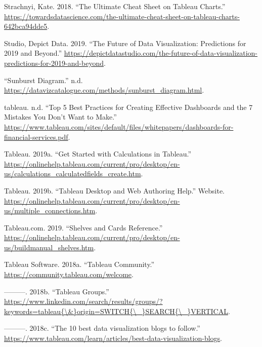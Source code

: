 \documentclass[]{book}
\begin{document}
\leavevmode\hypertarget{ref-Charts_CheatSheet}{}%
Strachnyi, Kate. 2018. ``The Ultimate Cheat Sheet on Tableau Charts.'' \url{https://towardsdatascience.com/the-ultimate-cheat-sheet-on-tableau-charts-642bca94dde5}.

\leavevmode\hypertarget{ref-depictdatastudio}{}%
Studio, Depict Data. 2019. ``The Future of Data Visualization: Predictions for 2019 and Beyond.'' \url{https://depictdatastudio.com/the-future-of-data-visualization-predictions-for-2019-and-beyond}.

\leavevmode\hypertarget{ref-sunburst-diag}{}%
``Sunburst Diagram.'' n.d. \url{https://datavizcatalogue.com/methods/sunburst_diagram.html}.

\leavevmode\hypertarget{ref-dashboard_practices}{}%
tableau. n.d. ``Top 5 Best Practices for Creating Effective Dashboards and the 7 Mistakes You Don't Want to Make.'' \href{\%20https://www.tableau.com/sites/default/files/whitepapers/dashboards-for-financial-services.pdf\%20}{https://www.tableau.com/sites/default/files/whitepapers/dashboards-for-financial-services.pdf}.

\leavevmode\hypertarget{ref-Tableau_Calculated_Fields}{}%
Tableau. 2019a. ``Get Started with Calculations in Tableau.'' \url{https://onlinehelp.tableau.com/current/pro/desktop/en-us/calculations_calculatedfields_create.htm}.

\leavevmode\hypertarget{ref-TableauHelp_connections}{}%
Tableau. 2019b. ``Tableau Desktop and Web Authoring Help.'' Website. \url{https://onlinehelp.tableau.com/current/pro/desktop/en-us/multiple_connections.htm}.

\leavevmode\hypertarget{ref-Tableau_Build_Manual}{}%
Tableau.com. 2019. ``Shelves and Cards Reference.'' \url{https://onlinehelp.tableau.com/current/pro/desktop/en-us/buildmanual_shelves.htm}.

\leavevmode\hypertarget{ref-Tableau_Community}{}%
Tableau Software. 2018a. ``Tableau Community.'' \url{https://community.tableau.com/welcome}.

\leavevmode\hypertarget{ref-LinkedIn_Groups}{}%
---------. 2018b. ``Tableau Groups.'' \href{https://www.linkedin.com/search/results/groups/?keywords=tableau\%7B/\&\%7Dorigin=SWITCH\%7B/_\%7DSEARCH\%7B/_\%7DVERTICAL}{https://www.linkedin.com/search/results/groups/?keywords=tableau\{\textbackslash{}\&\}origin=SWITCH\{\textbackslash{}\_\}SEARCH\{\textbackslash{}\_\}VERTICAL}.

\leavevmode\hypertarget{ref-Top_10_Blogs}{}%
---------. 2018c. ``The 10 best data visualization blogs to follow.'' \url{https://www.tableau.com/learn/articles/best-data-visualization-blogs}.
\end{document}
